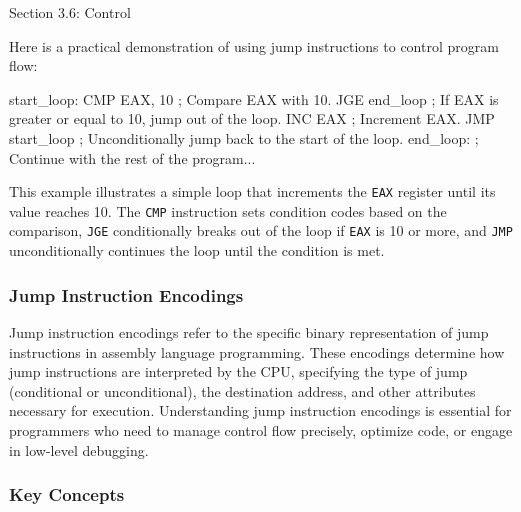 \begin{notes}{Section 3.6: Control}
    \begin{highlight}
        Here is a practical demonstration of using jump instructions to control program flow:
    
    \begin{code}[Assembly]
    start_loop:
        CMP EAX, 10       ; Compare EAX with 10.
        JGE end_loop      ; If EAX is greater or equal to 10, jump out of the loop.
        INC EAX           ; Increment EAX.
        JMP start_loop    ; Unconditionally jump back to the start of the loop.
    end_loop:
        ; Continue with the rest of the program...
    \end{code}
    
        This example illustrates a simple loop that increments the \texttt{EAX} register until its value reaches 10. The \texttt{CMP} instruction sets condition codes based on the comparison, \texttt{JGE} 
        conditionally breaks out of the loop if \texttt{EAX} is 10 or more, and \texttt{JMP} unconditionally continues the loop until the condition is met.
    \end{highlight}

    \subsubsection*{Jump Instruction Encodings}

    Jump instruction encodings refer to the specific binary representation of jump instructions in assembly language programming. These encodings determine how jump instructions are interpreted by the 
    CPU, specifying the type of jump (conditional or unconditional), the destination address, and other attributes necessary for execution. Understanding jump instruction encodings is essential for 
    programmers who need to manage control flow precisely, optimize code, or engage in low-level debugging.
    
    \subsubsection*{Key Concepts}
    

\end{notes}
